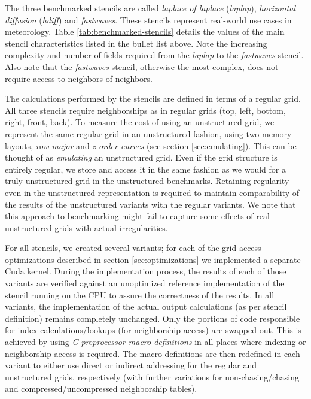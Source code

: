 The three benchmarked stencils are called \emph{laplace of laplace} (\emph{laplap}), \emph{horizontal diffusion} (\emph{hdiff}) and \emph{fastwaves}. These stencils represent real-world use cases in meteorology. Table \ref{tab:benchmarked-stencils} details the values of the main stencil characteristics listed in the bullet list above. Note the increasing complexity and number of fields required from the \emph{laplap} to the \emph{fastwaves} stencil. Also note that the \emph{fastwaves} stencil, otherwise the most complex, does not require access to neighbors-of-neighbors.

The calculations performed by the stencils are defined in terms of a regular grid. All three stencils require neighborships as in regular grids (top, left, bottom, right, front, back). To measure the cost of using an unstructured grid, we represent the same regular grid in an unstructured fashion, using two memory layouts, \emph{row-major} and \emph{z-order-curves} (see section \ref{sec:emulating}). This can be thought of as \emph{emulating} an unstructured grid. Even if the grid structure is entirely regular, we store and access it in the same fashion as we would for a truly unstructured grid in the unstructured benchmarks. Retaining regularity even in the unstructured representation is required to maintain comparability of the results of the unstructured variants with the regular variants. We note that this approach to benchmarking might fail to capture some effects of real unstructured grids with actual irregularities.

For all stencils, we created several variants; for each of the grid access optimizations described in section \ref{sec:optimizations} we implemented a separate Cuda kernel. During the implementation process, the results of each of those variants are verified against an unoptimized reference implementation of the stencil running on the CPU to assure the correctness of the results. In all variants, the implementation of the actual output calculations (as per stencil definition) remains completely unchanged. Only the portions of code responsible for index calculations/lookups (for neighborship access) are swapped out. This is achieved by using \emph{C preprocessor macro definitions} in all places where indexing or neighborship access is required. The macro definitions are then redefined in each variant to either use direct or indirect addressing for the regular and unstructured grids, respectively (with further variations for non-chasing/chasing and compressed/uncompressed neighborship tables).

